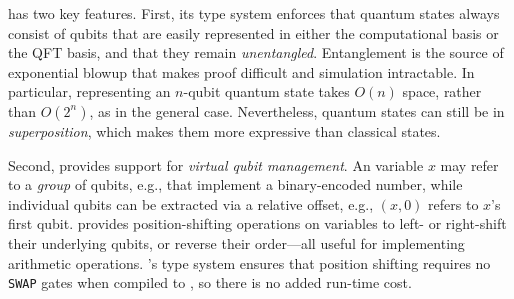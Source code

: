 \oqasm has two key features.
First, its type system
enforces that quantum states always consist of qubits that are easily
represented in either the computational basis or the QFT basis, and that they remain \emph{unentangled}. 
Entanglement is the source of
exponential blowup that makes proof difficult and simulation
intractable.
In particular, representing an $n$-qubit \oqasm quantum state
takes $O(n)$ space, rather than $O(2^n)$, as in the general case.
Nevertheless, \oqasm quantum states can still be in
\emph{superposition}, which makes them more expressive than
classical states.

Second, \oqasm provides support for \emph{virtual qubit
management}. An \oqasm variable $x$ may refer to a \emph{group} of qubits,
e.g., that implement a binary-encoded number, while individual qubits
can be extracted via a relative offset, e.g., $(x,0)$ refers to $x$'s
first qubit. \oqasm provides position-shifting operations on
variables to left- or right-shift their underlying qubits, or
reverse their order---all useful for implementing arithmetic
operations. \oqasm's type system ensures that position shifting
requires no \texttt{SWAP} gates when compiled to \sqir, so there is no
added run-time cost. 


